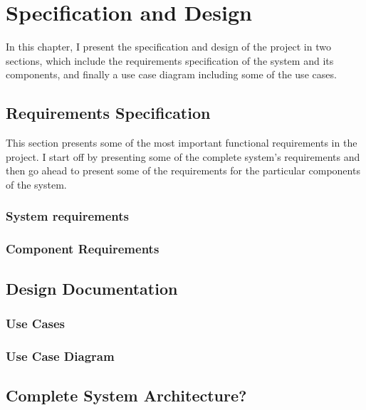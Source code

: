 \chapter{Specification and Design}\label{ch:mathtest} %
In this chapter, I present the specification and design of the project in two sections, which include the requirements specification of the system and its components, and finally a use case diagram including some of the use cases.

\section{Requirements Specification}
This section presents some of the most important functional requirements in the project. I start off by presenting some of the complete system's requirements and then go ahead to present some of the requirements for the particular components of the system.


\subsection{System requirements}


\subsection{Component Requirements}


\section{Design Documentation} %

\subsection{Use Cases}

\subsection{Use Case Diagram}

\section{Complete System Architecture?}

